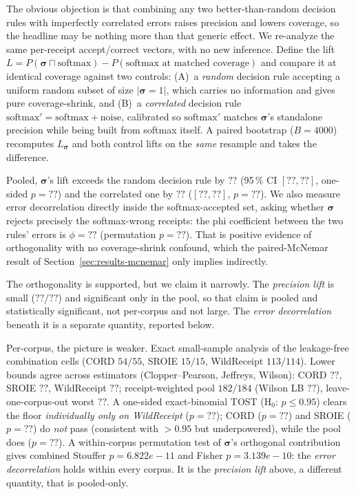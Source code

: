 \documentclass[conference]{IEEEtran}
\newcommand{\orthDrand}{??}
\newcommand{\orthDrandLo}{??}
\newcommand{\orthDrandHi}{??}
\newcommand{\orthDrandP}{??}
\newcommand{\orthDcorr}{??}
\newcommand{\orthDcorrLo}{??}
\newcommand{\orthDcorrHi}{??}
\newcommand{\orthDcorrP}{??}
\newcommand{\orthPhi}{??}
\newcommand{\orthPhiP}{??}
\newcommand{\rgCordWil}{??}
\newcommand{\rgSroieWil}{??}
\newcommand{\rgWrWil}{??}
\newcommand{\rgPoolWil}{??}
\newcommand{\rgLocoMinWil}{??}
\newcommand{\rgTostCordP}{??}
\newcommand{\rgTostSroieP}{??}
\newcommand{\rgTostWrP}{??}
\newcommand{\rgTostPoolP}{??}
\newcommand{\rgAFiveStouffer}{6.822e-11}
\newcommand{\rgAFiveFisher}{3.139e-10}
\let\IEEEsigma\sigma
\DeclareRobustCommand{\sigma}{{\boldsymbol{\IEEEsigma}}}
\begin{document}
\noindent The obvious objection is that combining any two
better-than-random decision rules with imperfectly correlated errors raises
precision and lowers coverage, so the headline may be nothing more than that
generic effect. We re-analyze the same per-receipt accept/correct vectors, with
no new inference.
Define the lift $L=P(\sigma\sqcap\text{softmax})-P(\text{softmax at matched
coverage})$ and compare it at identical coverage against two controls: (A)~a
\emph{random} decision rule accepting a uniform random subset of size
$|\sigma{=}1|$, which carries no information and gives pure coverage-shrink,
and (B)~a \emph{correlated} decision rule
$\text{softmax}'=\text{softmax}+\text{noise}$, calibrated so
$\text{softmax}'$ matches $\sigma$'s standalone precision while being built
from softmax itself. A paired bootstrap ($B{=}4000$) recomputes $L_\sigma$ and
both control lifts on the \emph{same} resample and takes the difference.

\noindent Pooled, $\sigma$'s lift
exceeds the random decision rule by $\orthDrand$ (95\,\% CI
$[\orthDrandLo,\orthDrandHi]$, one-sided $p{=}\orthDrandP$) and the correlated
one by $\orthDcorr$ ($[\orthDcorrLo,\orthDcorrHi]$, $p{=}\orthDcorrP$). We
also measure error decorrelation directly inside the softmax-accepted set,
asking whether $\sigma$ rejects precisely the softmax-wrong receipts: the phi
coefficient between the two rules' errors is $\phi{=}\orthPhi$ (permutation
$p{=}\orthPhiP$). That is positive evidence of
orthogonality with no coverage-shrink confound, which the paired-McNemar result
of Section~\ref{sec:results-mcnemar} only implies indirectly.

\noindent The orthogonality is supported, but we claim it narrowly. The
\emph{precision lift} is small ($\orthDrand$/$\orthDcorr$) and significant only
in the pool, so that claim is pooled and statistically significant, not
per-corpus and not large. The \emph{error decorrelation} beneath it is a
separate quantity, reported below.

\smallskip
\label{sec:results-percorpus-rigor}
\noindent Per-corpus, the picture is weaker. Exact small-sample analysis of
the leakage-free combination cells (CORD $54/55$, SROIE $15/15$,
WildReceipt $113/114$). Lower bounds agree across estimators
(Clopper--Pearson, Jeffreys, Wilson): CORD $\rgCordWil$, SROIE
$\rgSroieWil$, WildReceipt $\rgWrWil$; receipt-weighted pool
$182/184$ (Wilson LB $\rgPoolWil$), leave-one-corpus-out worst
$\rgLocoMinWil$. A one-sided exact-binomial TOST (H$_0$:
$p\le0.95$) clears the floor \emph{individually only on WildReceipt}
($p=\rgTostWrP$); CORD ($p=\rgTostCordP$) and SROIE
($p=\rgTostSroieP$) do \emph{not} pass (consistent with $>0.95$ but
underpowered), while the pool does ($p=\rgTostPoolP$). A
within-corpus permutation test of $\sigma$'s orthogonal contribution
gives combined Stouffer $p=\rgAFiveStouffer$ and Fisher
$p=\rgAFiveFisher$: the \emph{error decorrelation} holds within every corpus.
It is the \emph{precision lift} above, a different quantity, that is
pooled-only.
\end{document}
